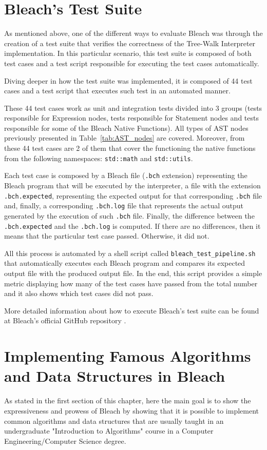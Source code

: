 \section{Bleach's Test Suite}
As mentioned above, one of the different ways to evaluate Bleach was through the creation of a test suite that verifies the correctness of the Tree-Walk Interpreter implementation. In this particular scenario, this test suite is composed of both test cases and a test script responsible for executing the test cases automatically.

Diving deeper in how the test suite was implemented, it is composed of 44 test cases and a test script that executes such test in an automated manner.

These 44 test cases work as unit and integration tests divided into 3 groups (tests responsible for Expression nodes, tests responsible for Statement nodes and tests responsible for some of the Bleach Native Functions). All types of AST nodes previously presented in Table~\ref{tab:AST_nodes} are covered. Moreover, from these 44 test cases are 2 of them that cover the functioning the native functions from the following namespaces: \texttt{std::math} and \texttt{std::utils}.

Each test case is composed by a Bleach file (\texttt{.bch} extension) representing the Bleach program that will be executed by the interpreter, a file with the extension 
 \texttt{.bch.expected}, representing the expected output for that corresponding \texttt{.bch} file and, finally, a corresponding \texttt{.bch.log} file that represents the actual output generated by the execution of such \texttt{.bch} file. Finally, the difference between the \texttt{.bch.expected} and the \texttt{.bch.log} is computed. If there are no differences, then it means that the particular test case passed. Otherwise, it did not.

 All this process is automated by a shell script called \texttt{bleach\_test\_pipeline.sh} that automatically executes each Bleach program and compares its expected output file with the produced output file. In the end, this script provides a simple metric displaying how many of the test cases have passed from the total number and it also shows which test cases did not pass.

 More detailed information about how to execute Bleach's test suite can be found at Bleach's official GitHub repository \cite{bleach_lang_git_repo}.


\section{Implementing Famous Algorithms and Data Structures in Bleach}
As stated in the first section of this chapter, here the main goal is to show the expressiveness and prowess of Bleach by showing that it is possible to implement common algorithms and data structures that are usually taught in an undergraduate "Introduction to Algorithms" course in a Computer Engineering/Computer Science degree.

